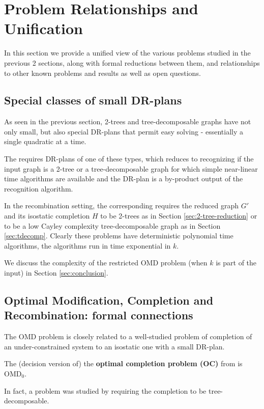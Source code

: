 \section{Problem Relationships and Unification}
\label{sec:table}
In this section we provide a unified view of  the various problems
studied in the previous 2 sections, along with formal reductions
between them, and relationships to other known problems and results as
well as open questions.
%
\subsection{Special classes of small DR-plans}
As seen in the previous section, 2-trees and tree-decomposable graphs
have not only small, but also special DR-plans that permit easy
solving - essentially a single quadratic at a time.

The  requires DR-plans of
one of these types, which reduces to recognizing if the input graph is
a 2-tree or a tree-decomposable graph for which simple near-linear
time algorithms are available \uncited and the DR-plan is a
by-product output of the recognition algorithm.

In the recombination setting, the corresponding  requires the reduced graph $G'$ and its isostatic
completion $H$ to be 2-trees as in Section \ref{sec:2-tree-reduction}
or to be a low Cayley complexity tree-decomposable graph as in Section
\ref{sec:tdecomp}. Clearly these problems have deterministic
polynomial time algorithms, the algorithms run in time exponential in
$k$. 

We discuss the complexity of the restricted 
OMD problem (when $k$ is part of the input) 
in Section \ref{sec:conclusion}.


\subsection{Optimal Modification, Completion and Recombination: formal
connections}
%
The OMD problem is closely related to a well-studied problem of
completion of an under-constrained system to an isostatic one with a
small DR-plan.
\begin{observation}
\label{obs:OC_to_OMB}
    The (decision version of) the {\bf optimal completion problem
    (OC)} from \cite{bib:survey, j-a, fang} is OMD$_0$.
\end{observation}
In fact, a  problem was studied by \cite{j-a}
requiring the completion to be tree-decomposable. 

